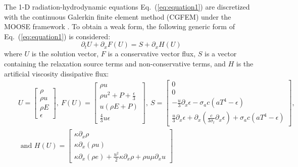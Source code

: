 \documentclass[review]{elsarticle}
\newcommand{\eqt}[1]{Eq.~(\ref{#1})}                     %
\begin{document}
The 1-D radiation-hydrodynamic equations \eqt{eq:equation1} are discretized with the continuous Galerkin finite element method (CGFEM) under the MOOSE framework \cite{Moose}. To obtain a weak form, the following generic form of \eqt{eq:equation1} is considered:
\begin{equation}
\label{eq:form}
\partial_t U + \partial_x F \left( U \right) = S + \partial_x H \left(U\right)
\end{equation}
where $U$ is the solution vector, $F$ is a conservative vector flux, $S$ is a vector containing the relaxation source terms and non-conservative terms, and $H$ is the artificial viscosity dissipative flux:
\begin{eqnarray*}
&&U = 
\begin{bmatrix}
\rho \\
\rho u \\
\rho E \\
\epsilon
\end{bmatrix}
,\
F(U) = 
\begin{bmatrix}
\rho u \\
\rho u^2 + P + \frac{\epsilon}{3} \\
u \left( \rho E + P \right) \\
\frac{4}{3} u \epsilon
\end{bmatrix}
,\
S = 
\begin{bmatrix}
0 \\
0 \\
-\frac{u}{3} \partial_x \epsilon - \sigma_a c \left( a T^4 - \epsilon \right) \\
\frac{u}{3} \partial_x \epsilon + \partial_x \left( \frac{c}{3 \sigma_t} \partial_x \epsilon \right) + \sigma_a c \left( a T^4 - \epsilon \right)
\end{bmatrix}
,
\\
&&\text{ and } 
H(U) = 
\begin{bmatrix}
\kappa \partial_x \rho \\
\kappa \partial_x (\rho u) \\
\kappa \partial_x \left( \rho e \right) + \frac{u^2}{2} \kappa \partial_x \rho + \rho u \mu \partial_x u
\end{bmatrix}
\end{eqnarray*}
\end{document}
